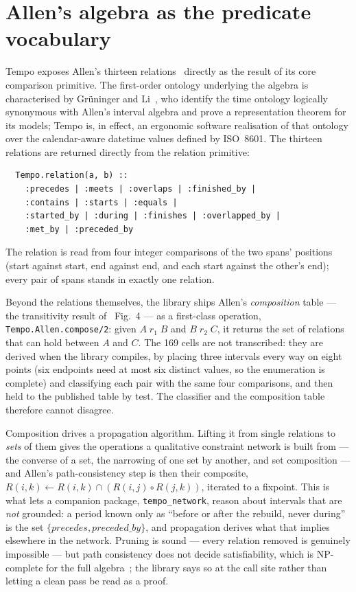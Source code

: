 \section{Allen's algebra as the predicate vocabulary}

Tempo exposes Allen's thirteen relations~\cite{allen1983} directly as
the result of its core comparison primitive. The first-order ontology
underlying the algebra is characterised by Gr\"uninger and
Li~\cite{gruninger2017allenontology}, who identify the time ontology
logically synonymous with Allen's interval algebra and prove a
representation theorem for its models; Tempo is, in effect, an
ergonomic software realisation of that ontology over the
calendar-aware datetime values defined by ISO~8601. The thirteen
relations are returned directly from the relation primitive:
\begin{verbatim}
  Tempo.relation(a, b) ::
    :precedes | :meets | :overlaps | :finished_by |
    :contains | :starts | :equals |
    :started_by | :during | :finishes | :overlapped_by |
    :met_by | :preceded_by
\end{verbatim}
The relation is read from four integer comparisons of the two spans'
positions (start against start, end against end, and each start
against the other's end); every pair of spans stands in exactly one
relation.

Beyond the relations themselves, the library ships Allen's
\emph{composition} table --- the transitivity result of~\cite{allen1983}
Fig.~4 --- as a first-class operation, \texttt{Tempo.Allen.compose/2}:
given $A\;r_1\;B$ and $B\;r_2\;C$, it returns the set of relations that
can hold between $A$ and $C$. The 169 cells are not transcribed: they
are derived when the library compiles, by placing three intervals every
way on eight points (six endpoints need at most six distinct values, so
the enumeration is complete) and classifying each pair with the same
four comparisons, and then held to the published table by test. The
classifier and the composition table therefore cannot disagree.

Composition drives a propagation algorithm. Lifting it from single
relations to \emph{sets} of them gives the operations a qualitative
constraint network is built from --- the converse of a set, the
narrowing of one set by another, and set composition --- and Allen's
path-consistency step is then their composite,
$R(i,k) \leftarrow R(i,k) \cap (R(i,j) \circ R(j,k))$, iterated to a
fixpoint. This is what lets a companion package, \texttt{tempo\_network},
reason about intervals that are \emph{not} grounded: a period known
only as ``before or after the rebuild, never during'' is the set
$\{\textit{precedes}, \textit{preceded\_by}\}$, and propagation derives
what that implies elsewhere in the network. Pruning is sound --- every
relation removed is genuinely impossible --- but path consistency does
not decide satisfiability, which is NP-complete for the full
algebra~\cite{vilainkautz1986,nebel1995}; the library says so at the
call site rather than letting a clean pass be read as a proof.

